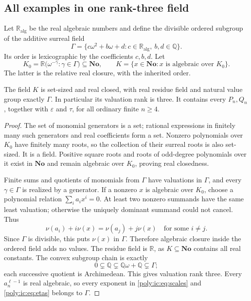 \documentclass[11pt,a4paper]{article}
\numberwithin{equation}{section}
\theoremstyle{plain}
\newcommand{\No}{\mathbf{No}}
\newcommand{\R}{\mathbb R}
\newcommand{\Q}{\mathbb Q}
\newcommand{\eps}{\varepsilon}
\newcommand{\alg}{\mathrm{alg}}
\begin{document}
\subsection{All examples in one rank-three field}
Let $\R_\alg$ be the real algebraic numbers and define the divisible
ordered subgroup of the additive surreal field
\begin{equation}\label{poly:ic:eq:gamma}
 \Gamma=\{c\omega^2+b\omega+d:
                c\in\R_\alg,\ b,d\in\Q\}.
\end{equation}
Its order is lexicographic by the coefficients $c,b,d$. Let
\[
 K_0=\R\bigl(\omega^{-\gamma}:\gamma\in\Gamma\bigr)\subseteq\No,
 \qquad
 K=\{x\in\No:x\text{ is algebraic over }K_0\}.
\]
The latter is the relative real closure, with the inherited order.

\begin{proposition}\label{poly:ic:prop:fixedfield}
The field $K$ is set-sized and real closed, with real residue field and
natural value group exactly $\Gamma$. In particular its valuation rank
is three. It contains every $P_n,Q_n$, together with $\eps$ and $\tau$,
for all ordinary finite $n\geq4$.
\end{proposition}
\begin{proof}
The set of monomial generators is a set; rational expressions in finitely
many such generators and real coefficients form a set. Nonzero polynomials
over $K_0$ have finitely many roots, so the collection of their surreal
roots is also set-sized. It is a field. Positive square roots and roots
of odd-degree polynomials over it exist in $\No$ and remain algebraic
over $K_0$, proving real closedness.

Finite sums and quotients of monomials from $\Gamma$ have valuations in
$\Gamma$, and every $\gamma\in\Gamma$ is realized by a generator.
If a nonzero $x$ is algebraic over $K_0$, choose a polynomial relation
$\sum_i a_ix^i=0$. At least two nonzero summands have the same least
valuation; otherwise the uniquely dominant summand could not cancel.
Thus
\[
 \nu(a_i)+i\nu(x)=\nu(a_j)+j\nu(x)
 \quad\text{for some }i\ne j.
\]
Since $\Gamma$ is divisible, this puts $\nu(x)$ in $\Gamma$.
Therefore algebraic closure inside the ordered field adds no values.
The residue field is $\R$, as $K\subseteq\No$ contains all real constants.
The convex subgroup chain is exactly
\[
 0\subsetneq\Q\subsetneq\Q\omega+\Q\subsetneq\Gamma;
\]
each successive quotient is Archimedean. This gives valuation rank three.
Every $a_n^{\ell-1}$ is real algebraic, so every exponent in
\eqref{poly:ic:eq:scales} and \eqref{poly:ic:eq:etas} belongs to $\Gamma$.
\end{proof}
\end{document}

